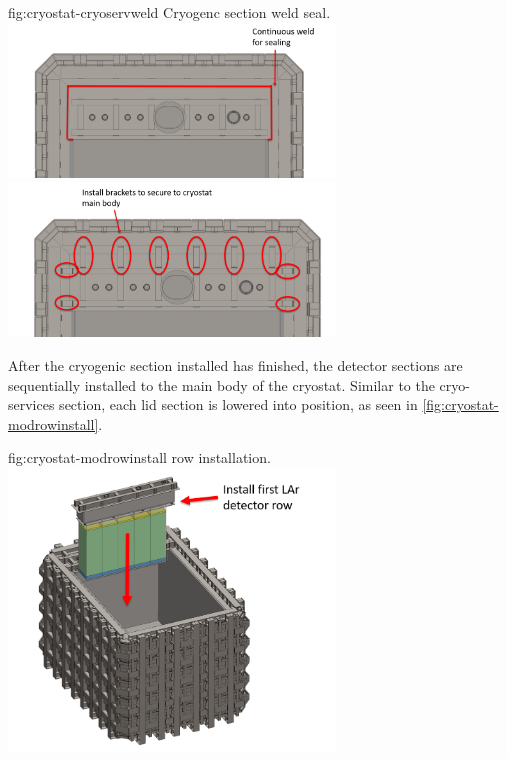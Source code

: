 \begin{dunefigure}{fig:cryostat-cryoservweld}
{Cryogenc section weld seal.}
\includegraphics[width=0.65\textwidth]{graphics/cryostat/cryostat-cryoservweld.png}
\includegraphics[width=0.65\textwidth]{graphics/cryostat/cryostat-cryoservbrack.png}
\end{dunefigure}


After the cryogenic section installed has finished, the  detector sections are sequentially installed to the main body of the cryostat.  Similar to the cryo-services section, each  lid section is lowered into position, as seen in \ref{fig:cryostat-modrowinstall}. 

\begin{dunefigure}{fig:cryostat-modrowinstall}
{ row installation.}
\includegraphics[width=0.65\textwidth]{graphics/cryostat/cryostat-modrowinstall.png}
\end{dunefigure}


